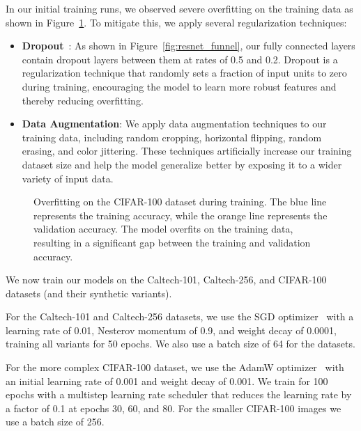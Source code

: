 In our initial training runs,
we observed severe overfitting on the training data as shown in Figure~\ref{fig:overfitting}.
To mitigate this, we apply several regularization techniques:
\begin{itemize}
      \item \textbf{Dropout}~\cite{hinton_improving_2012}:
            As shown in Figure~\ref{fig:resnet_funnel},
            our fully connected layers contain dropout layers between them at rates of 0.5 and 0.2.
            Dropout is a regularization technique that randomly sets a fraction of input units to zero during training,
            encouraging the model to learn more robust features and thereby reducing overfitting.
      \item \textbf{Data Augmentation}:
            We apply data augmentation techniques to our training data,
            including random cropping, horizontal flipping, random erasing, and color jittering.
            These techniques artificially increase our training dataset size
            and help the model generalize better by exposing it to a wider variety of input data.
\end{itemize}

\begin{figure}[H]
      \centering
      \resizebox{0.6\textwidth}{!}{}
      \caption{Overfitting on the CIFAR-100 dataset during training.
            The blue line represents the training accuracy,
            while the orange line represents the validation accuracy.
            The model overfits on the training data, resulting in a significant gap
            between the training and validation accuracy.}
      \label{fig:overfitting}
\end{figure}

We now train our models on the Caltech-101, Caltech-256, and CIFAR-100 datasets
(and their synthetic variants).

For the Caltech-101 and Caltech-256 datasets,
we use the SGD optimizer~\cite{sutskever_importance_2013} with a learning rate of 0.01,
Nesterov momentum of 0.9, and weight decay of 0.0001, training all variants for 50 epochs.
We also use a batch size of 64 for the datasets.

For the more complex CIFAR-100 dataset,
we use the AdamW optimizer~\cite{loshchilov_decoupled_2017} with an initial learning rate of 0.001 and weight decay of 0.001.
We train for 100 epochs with a multistep learning rate scheduler that reduces the learning rate by a factor of 0.1 at epochs 30, 60, and 80.
For the smaller CIFAR-100 images we use a batch size of 256.

